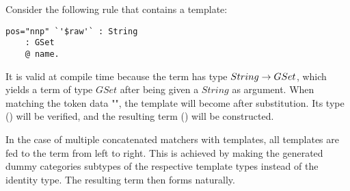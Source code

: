 \documentclass[main.tex]{subfiles}
\begin{document}
\begin{mexample}
Consider the following rule that contains a template:
\begin{lstwrap}\begin{lstlisting}
pos="nnp" `'$raw'` : String
    : GSet
    @ name.
\end{lstlisting}\end{lstwrap}
It is valid at compile time because the term  has type
$String \rightarrow GSet$, which yields a term of type $GSet$ after being given
a $String$ as argument.
When matching the token data "", the template
 will become
 after substitution. Its type
() will be verified, and the resulting term
() will be constructed.
\end{mexample}

In the case of multiple concatenated matchers with templates, all templates
are fed to the term from left to right. This is achieved by making the
generated dummy categories subtypes of the respective template types instead
of the identity type. The resulting term then forms naturally.
\end{document}
